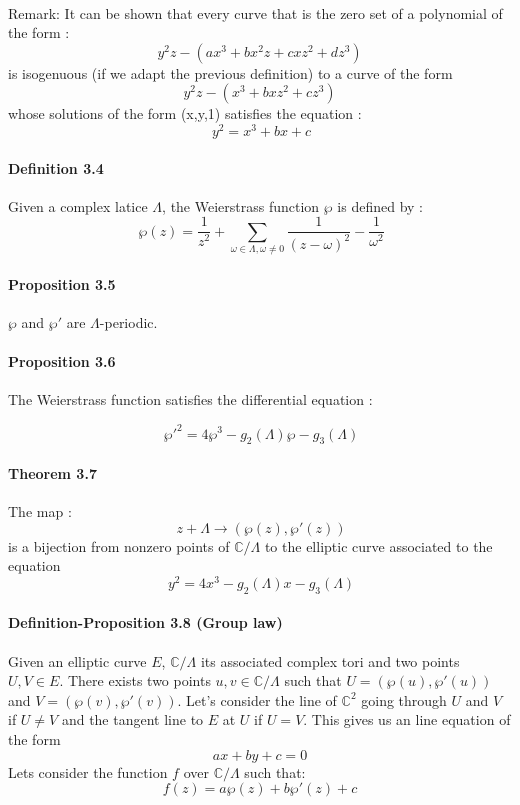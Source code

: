 \documentclass[letterpaper,10pt]{article}
\begin{document}
{\itshape \paragraph{}Remark: It can be shown that every curve that is the zero set of a polynomial of the form : 
\[ y^2z - (ax^3+bx^2z+ cxz^2 + dz^3)\]
is isogenuous (if we adapt the previous definition) to a curve of the form \[ y^2z - (x^3+bxz^2 + cz^3)\]
whose solutions of the form (x,y,1) satisfies the equation : \[\ y^2 = x^3 + bx + c \]

}



\paragraph{Definition 3.4} Given a complex latice $\Lambda$, the Weierstrass function $\wp$ is defined by : 
\[\ \wp(z) = \frac{1}{z^2} +  \sum_{\omega \in \Lambda , \omega \neq 0 }\frac{1}{(z - \omega)^2} - \frac{1}{\omega^2} \]
\paragraph{Proposition 3.5} $\wp$ and $\wp'$ are $\Lambda$-periodic.

\paragraph{Proposition 3.6} The Weierstrass function satisfies the differential equation : 

\[\ \wp'^2 = 4\wp^3 - g_2(\Lambda)\wp - g_3(\Lambda) \]

\paragraph{Theorem 3.7} The map : \[\ z + \Lambda \to (\wp(z),\wp'(z)) \]
is a bijection from nonzero points of $\mathbb{C} / \Lambda$ to the elliptic curve associated to the equation \[\ y^2 = 4x^3 - g_2(\Lambda)x - g_3(\Lambda) \]

\paragraph{Definition-Proposition 3.8 (Group law)} Given an elliptic curve $E$, $\mathbb{C}/\Lambda$ its associated complex tori and two points $U,V \in E$. There exists
two points $u,v\in\mathbb{C}/\Lambda $ such that $U=(\wp(u),\wp'(u))$ and $ V = (\wp(v),\wp'(v))$. Let's consider the line of $\mathbb{C}^2$ going 
through $U$ and $V$ if $U \neq V$ and the tangent line to $E$ at $U$ if $U=V$. This gives us an line equation of the form \[ ax+ by + c = 0  \]
Lets consider the function $f$ over $\mathbb{C}/\Lambda$ such that: \[ f(z) = a\wp(z) + b\wp'(z) + c \]
\end{document}
